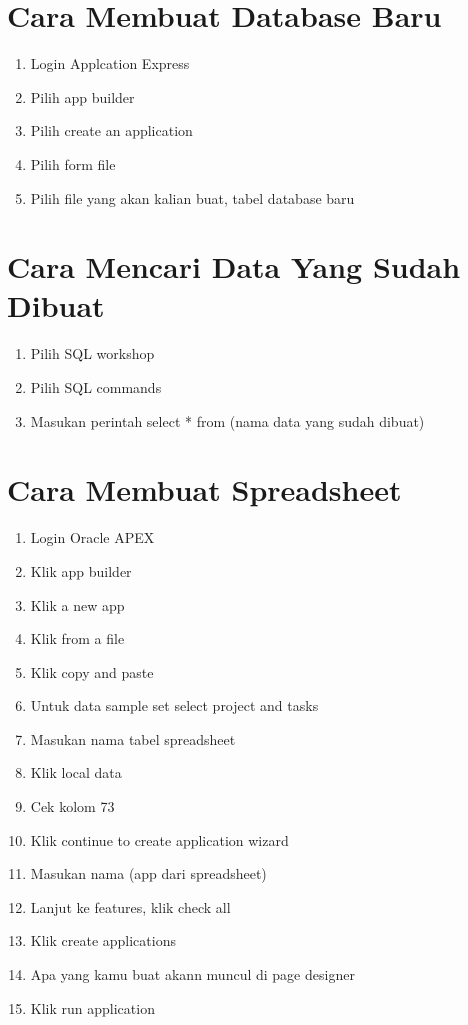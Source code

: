 \documentclass{article}
\begin{document}
\section{Cara Membuat Database Baru}
\begin{enumerate}
    \item Login Applcation Express
    \item Pilih app builder
    \item Pilih create an application
    \item Pilih form file
    \item Pilih file yang akan kalian buat, tabel database baru
\end{enumerate}

\section{Cara Mencari Data Yang Sudah Dibuat}
\begin{enumerate}
    \item Pilih SQL workshop
    \item Pilih SQL commands
    \item Masukan perintah select * from (nama data yang sudah dibuat)
\end{enumerate}

\section{Cara Membuat Spreadsheet}
\begin{enumerate}
    \item Login Oracle APEX
    \item Klik app builder
    \item Klik a new app
    \item Klik from a file
    \item Klik copy and paste
    \item Untuk data sample set select project and tasks
    \item Masukan nama tabel spreadsheet
    \item Klik local data
    \item Cek kolom 73
    \item Klik continue to create application wizard
    \item Masukan nama (app dari spreadsheet)
    \item Lanjut ke features, klik check all
    \item Klik create applications
    \item Apa yang kamu buat akann muncul di page designer
    \item Klik run application
\end{enumerate}
\end{document}
